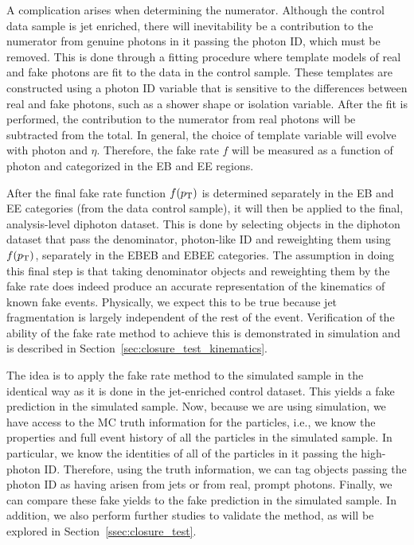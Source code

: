 A complication arises when determining the numerator. Although the control data sample is jet enriched, there will inevitability be a contribution to the numerator from genuine photons in it passing the photon ID, which must be removed. This is done through a fitting procedure where template models of real and fake photons are fit to the data in the control sample. These templates are constructed using a photon ID variable that is sensitive to the differences between real and fake photons, such as a shower shape or isolation variable. After the fit is performed, the contribution to the numerator from real photons will be subtracted from the total. In general, the choice of template variable will evolve with photon \pt and $\eta$. Therefore, the fake rate $f$ will be measured as a function of photon \pt and categorized in the EB and EE regions.

After the final fake rate function $f(p_{\mathrm{T}})$ is determined separately in the EB and EE categories (from the data control sample), it will then be applied to the final, analysis-level diphoton dataset. This is done by selecting objects in the diphoton dataset that pass the denominator, photon-like ID and reweighting them using $f(p_{\mathrm{T}})$, separately in the EBEB and EBEE categories. The assumption in doing this final step is that taking denominator objects and reweighting them by the fake rate does indeed produce an accurate representation of the kinematics of known fake events. Physically, we expect this to be true because jet fragmentation is largely independent of the rest of the event.  Verification of the ability of the fake rate method to achieve this is demonstrated in simulation and is described in Section~\ref{sec:closure_test_kinematics}.

 The idea is to apply the fake rate method to the simulated sample in the identical way as it is done in the jet-enriched control dataset. This yields a fake prediction in the simulated sample. Now, because we are using simulation, we have access to the MC truth information for the particles, i.e., we know the properties and full event history of all the particles in the simulated sample. In particular, we know the identities of all of the particles in it passing the high-\pt photon ID. Therefore, using the truth information, we can tag objects passing the photon ID as having arisen from jets or from real, prompt photons. Finally, we can compare these fake yields to the fake prediction in the simulated sample. In addition, we also perform further studies to validate the method, as will be explored in Section~\ref{ssec:closure_test}.


